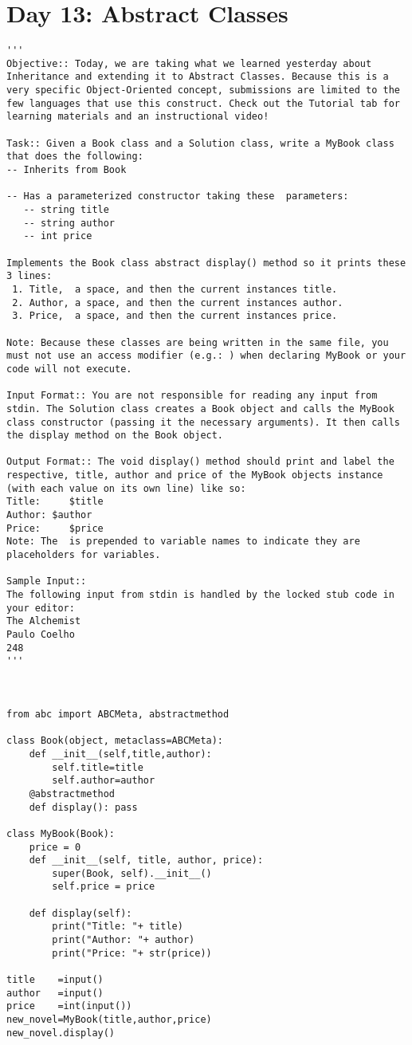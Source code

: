 \documentclass[11pt,a4paper]{article}
\begin{document}
\newpage
\section{Day 13: Abstract Classes}

\begin{lstlisting}
'''
Objective:: Today, we are taking what we learned yesterday about Inheritance and extending it to Abstract Classes. Because this is a very specific Object-Oriented concept, submissions are limited to the few languages that use this construct. Check out the Tutorial tab for learning materials and an instructional video!

Task:: Given a Book class and a Solution class, write a MyBook class that does the following:
-- Inherits from Book

-- Has a parameterized constructor taking these  parameters:
   -- string title
   -- string author
   -- int price
   
Implements the Book class abstract display() method so it prints these 3 lines:
 1. Title,  a space, and then the current instances title. 
 2. Author, a space, and then the current instances author. 
 3. Price,  a space, and then the current instances price.

Note: Because these classes are being written in the same file, you
must not use an access modifier (e.g.: ) when declaring MyBook or your
code will not execute.

Input Format:: You are not responsible for reading any input from stdin. The Solution class creates a Book object and calls the MyBook class constructor (passing it the necessary arguments). It then calls the display method on the Book object.

Output Format:: The void display() method should print and label the respective, title, author and price of the MyBook objects instance (with each value on its own line) like so:
Title:     $title
Author: $author
Price:     $price
Note: The  is prepended to variable names to indicate they are placeholders for variables.

Sample Input::
The following input from stdin is handled by the locked stub code in your editor:
The Alchemist
Paulo Coelho
248
'''



from abc import ABCMeta, abstractmethod

class Book(object, metaclass=ABCMeta):
    def __init__(self,title,author):
        self.title=title
        self.author=author   
    @abstractmethod
    def display(): pass

class MyBook(Book):
    price = 0
    def __init__(self, title, author, price):
        super(Book, self).__init__()
        self.price = price 

    def display(self):
        print("Title: "+ title)
        print("Author: "+ author)
        print("Price: "+ str(price))

title    =input()
author   =input()
price    =int(input())
new_novel=MyBook(title,author,price)
new_novel.display()

\end{lstlisting}
\end{document}
